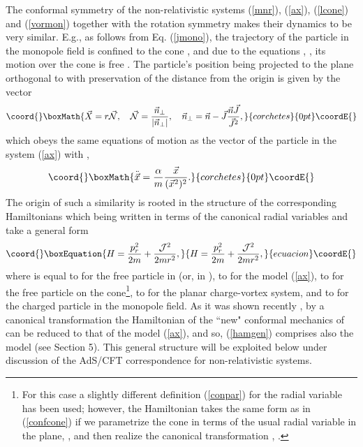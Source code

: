 \documentclass[a4paper,12pt]{article}
\def\R{\mathbb R}
\begin{document}
The  conformal symmetry of the
non-relativistic systems
(\ref{mnr}), (\ref{ax}),
(\ref{lcone})
and (\ref{vormon})
together with the rotation symmetry
makes their dynamics to be very similar.
E.g., as follows from Eq.
(\ref{jmono}),
the trajectory of the particle in the monopole
field is confined to the
cone \coordHE{},
and due to the equations
\coordHE{},
\coordHE{},
its motion over the cone is free \cite{mp}.
The particle's position
being projected to the plane orthogonal
to \coordHE{} with preservation of the distance
from the origin is
given by the vector
\[\coord{}\boxMath{
\vec X=r\vec {\cal N},\quad \vec {\cal N}=
\frac{\vec n_\perp}{|\vec n_\perp|},\quad \vec n_\perp=
\vec n-\vec J
\frac{\vec n\vec J}{\vec J^2} ,
}{corchetes}{0pt}\coordE{}\]
which obeys the same equations of motion as the vector
\coordHE{} of the particle in the system
(\ref{ax}) with \coordHE{},
\[\coord{}\boxMath{
\ddot{\vec x}=\frac{\alpha}{m}\frac{\vec x}{(\vec x^2)^2}.
}{corchetes}{0pt}\coordE{}\]
The origin of such a similarity
is rooted in the structure
of the corresponding Hamiltonians
which being written in terms of
the canonical radial variables
\coordHE{} and
\coordHE{} take a general
form
\begin{equation}\coord{}\boxEquation{
H=\frac{p_r^2}{2m}+\frac{{\cal J}^2}{2mr^2},
\label{hamgen}
}{
H=\frac{p_r^2}{2m}+\frac{{\cal J}^2}{2mr^2},
}{ecuacion}\coordE{}\end{equation}
where \coordHE{} is equal to
\coordHE{} for the
free particle in \myHighlight{$\R^d$}\coordHE{}
(or, in \coordHE{}),
to \coordHE{}
for the model (\ref{ax}),
to \coordHE{} for the free particle
on the  cone\footnote{For this case
a slightly different definition (\ref{conpar})
for
the radial variable has been used;
however, the Hamiltonian takes the same form
as in (\ref{confcone})
if we parametrize the cone in terms of the usual
radial variable in the plane,
\coordHE{}, and then realize
the canonical transformation \coordHE{},
\coordHE{}.},
to \coordHE{}
for the planar charge-vortex system,
and to \coordHE{} for the charged particle
in the monopole field.
As it was shown recently \cite{Bell},  by a canonical
transformation
the Hamiltonian of the ``new" conformal mechanics
of \cite{kallosh} can be reduced  to that of
the model (\ref{ax}), and so,
(\ref{hamgen}) comprises also
the model \cite{kallosh} (see Section 5).
This general structure will be exploited
below under discussion of the
AdS/CFT correspondence for non-relativistic
systems.
\end{document}
